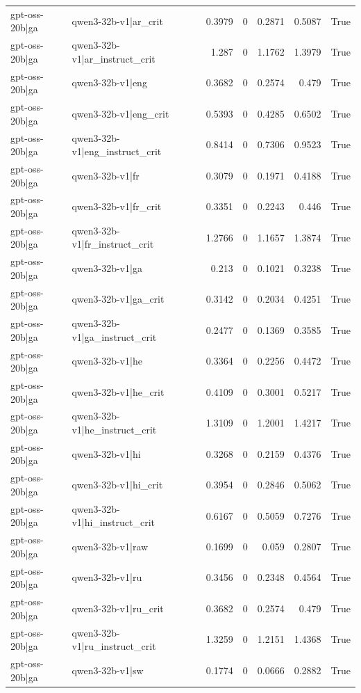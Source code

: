 \begin{table}
\begin{tabular}{l l r r r r l}
gpt-oss-20b|ga & qwen3-32b-v1|ar_crit & 0.3979 & 0 & 0.2871 & 0.5087 & True \\
gpt-oss-20b|ga & qwen3-32b-v1|ar_instruct_crit & 1.287 & 0 & 1.1762 & 1.3979 & True \\
gpt-oss-20b|ga & qwen3-32b-v1|eng & 0.3682 & 0 & 0.2574 & 0.479 & True \\
gpt-oss-20b|ga & qwen3-32b-v1|eng_crit & 0.5393 & 0 & 0.4285 & 0.6502 & True \\
gpt-oss-20b|ga & qwen3-32b-v1|eng_instruct_crit & 0.8414 & 0 & 0.7306 & 0.9523 & True \\
gpt-oss-20b|ga & qwen3-32b-v1|fr & 0.3079 & 0 & 0.1971 & 0.4188 & True \\
gpt-oss-20b|ga & qwen3-32b-v1|fr_crit & 0.3351 & 0 & 0.2243 & 0.446 & True \\
gpt-oss-20b|ga & qwen3-32b-v1|fr_instruct_crit & 1.2766 & 0 & 1.1657 & 1.3874 & True \\
gpt-oss-20b|ga & qwen3-32b-v1|ga & 0.213 & 0 & 0.1021 & 0.3238 & True \\
gpt-oss-20b|ga & qwen3-32b-v1|ga_crit & 0.3142 & 0 & 0.2034 & 0.4251 & True \\
gpt-oss-20b|ga & qwen3-32b-v1|ga_instruct_crit & 0.2477 & 0 & 0.1369 & 0.3585 & True \\
gpt-oss-20b|ga & qwen3-32b-v1|he & 0.3364 & 0 & 0.2256 & 0.4472 & True \\
gpt-oss-20b|ga & qwen3-32b-v1|he_crit & 0.4109 & 0 & 0.3001 & 0.5217 & True \\
gpt-oss-20b|ga & qwen3-32b-v1|he_instruct_crit & 1.3109 & 0 & 1.2001 & 1.4217 & True \\
gpt-oss-20b|ga & qwen3-32b-v1|hi & 0.3268 & 0 & 0.2159 & 0.4376 & True \\
gpt-oss-20b|ga & qwen3-32b-v1|hi_crit & 0.3954 & 0 & 0.2846 & 0.5062 & True \\
gpt-oss-20b|ga & qwen3-32b-v1|hi_instruct_crit & 0.6167 & 0 & 0.5059 & 0.7276 & True \\
gpt-oss-20b|ga & qwen3-32b-v1|raw & 0.1699 & 0 & 0.059 & 0.2807 & True \\
gpt-oss-20b|ga & qwen3-32b-v1|ru & 0.3456 & 0 & 0.2348 & 0.4564 & True \\
gpt-oss-20b|ga & qwen3-32b-v1|ru_crit & 0.3682 & 0 & 0.2574 & 0.479 & True \\
gpt-oss-20b|ga & qwen3-32b-v1|ru_instruct_crit & 1.3259 & 0 & 1.2151 & 1.4368 & True \\
gpt-oss-20b|ga & qwen3-32b-v1|sw & 0.1774 & 0 & 0.0666 & 0.2882 & True \\

\end{tabular}
\end{table}
